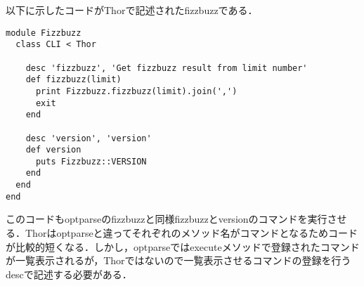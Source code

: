 以下に示したコードがThorで記述されたfizzbuzzである．
\begin{lstlisting}[style=customRuby,basicstyle={\scriptsize\ttfamily}]
module Fizzbuzz                                                   
  class CLI < Thor

    desc 'fizzbuzz', 'Get fizzbuzz result from limit number'
    def fizzbuzz(limit)
      print Fizzbuzz.fizzbuzz(limit).join(',')
      exit
    end

    desc 'version', 'version'
    def version
      puts Fizzbuzz::VERSION
    end
  end
end
\end{lstlisting}
このコードもoptparseのfizzbuzzと同様fizzbuzzとversionのコマンドを実行させる．Thorはoptparseと違ってそれぞれのメソッド名がコマンドとなるためコードが比較的短くなる．しかし，optparseではexecuteメソッドで登録されたコマンドが一覧表示されるが，Thorではないので一覧表示させるコマンドの登録を行うdescで記述する必要がある．

